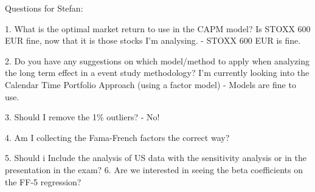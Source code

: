 Questions for Stefan:

1. What is the optimal market return to use in the CAPM model? Is STOXX 600 EUR fine, now that it is those stocks I'm analysing. 
- STOXX 600 EUR is fine. 

2. Do you have any suggestions on which model/method to apply when analyzing the long term effect in a event study methodology? I'm currently looking into the Calendar Time Portfolio Approach (using a factor model) - Models are fine to use. 

3. Should I remove the 1\% outliers?
- No!



4. Am I collecting the Fama-French factors the correct way? 

5.  Should i Include the analysis of US data with the sensitivity analysis or in the presentation in the exam?
6. Are we interested in seeing the beta coefficients on the FF-5 regression?
